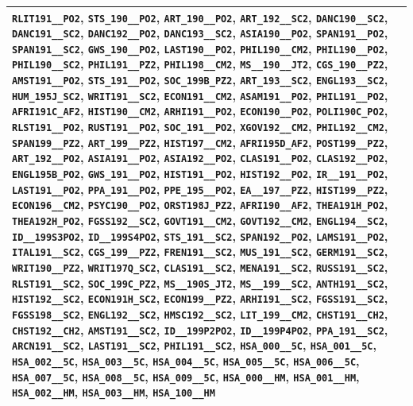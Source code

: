 \begin{longtable}{|p{4.4in}|p{4.4in}|}
\verb|RLIT191__PO2|, \verb|STS_190__PO2|, \verb|ART_190__PO2|, \verb|ART_192__SC2|, \verb|DANC190__SC2|, \verb|DANC191__SC2|, \verb|DANC192__PO2|, \verb|DANC193__SC2|, \verb|ASIA190__PO2|, \verb|SPAN191__PO2|, \verb|SPAN191__SC2|, \verb|GWS_190__PO2|, \verb|LAST190__PO2|, \verb|PHIL190__CM2|, \verb|PHIL190__PO2|, \verb|PHIL190__SC2|, \verb|PHIL191__PZ2|, \verb|PHIL198__CM2|, \verb|MS__190__JT2|, \verb|CGS_190__PZ2|, \verb|AMST191__PO2|, \verb|STS_191__PO2|, \verb|SOC_199B_PZ2|, \verb|ART_193__SC2|, \verb|ENGL193__SC2|, \verb|HUM_195J_SC2|, \verb|WRIT191__SC2|, \verb|ECON191__CM2|, \verb|ASAM191__PO2|, \verb|PHIL191__PO2|, \verb|AFRI191C_AF2|, \verb|HIST190__CM2|, \verb|ARHI191__PO2|, \verb|ECON190__PO2|, \verb|POLI190C_PO2|, \verb|RLST191__PO2|, \verb|RUST191__PO2|, \verb|SOC_191__PO2|, \verb|XGOV192__CM2|, \verb|PHIL192__CM2|, \verb|SPAN199__PZ2|, \verb|ART_199__PZ2|, \verb|HIST197__CM2|, \verb|AFRI195D_AF2|, \verb|POST199__PZ2|, \verb|ART_192__PO2|, \verb|ASIA191__PO2|, \verb|ASIA192__PO2|, \verb|CLAS191__PO2|, \verb|CLAS192__PO2|, \verb|ENGL195B_PO2|, \verb|GWS_191__PO2|, \verb|HIST191__PO2|, \verb|HIST192__PO2|, \verb|IR__191__PO2|, \verb|LAST191__PO2|, \verb|PPA_191__PO2|, \verb|PPE_195__PO2|, \verb|EA__197__PZ2|, \verb|HIST199__PZ2|, \verb|ECON196__CM2|, \verb|PSYC190__PO2|, \verb|ORST198J_PZ2|, \verb|AFRI190__AF2|, \verb|THEA191H_PO2|, \verb|THEA192H_PO2|, \verb|FGSS192__SC2|, \verb|GOVT191__CM2|, \verb|GOVT192__CM2|, \verb|ENGL194__SC2|, \verb|ID__199S3PO2|, \verb|ID__199S4PO2|, \verb|STS_191__SC2|, \verb|SPAN192__PO2|, \verb|LAMS191__PO2|, \verb|ITAL191__SC2|, \verb|CGS_199__PZ2|, \verb|FREN191__SC2|, \verb|MUS_191__SC2|, \verb|GERM191__SC2|, \verb|WRIT190__PZ2|, \verb|WRIT197Q_SC2|, \verb|CLAS191__SC2|, \verb|MENA191__SC2|, \verb|RUSS191__SC2|, \verb|RLST191__SC2|, \verb|SOC_199C_PZ2|, \verb|MS__190S_JT2|, \verb|MS__199__SC2|, \verb|ANTH191__SC2|, \verb|HIST192__SC2|, \verb|ECON191H_SC2|, \verb|ECON199__PZ2|, \verb|ARHI191__SC2|, \verb|FGSS191__SC2|, \verb|FGSS198__SC2|, \verb|ENGL192__SC2|, \verb|HMSC192__SC2|, \verb|LIT_199__CM2|, \verb|CHST191__CH2|, \verb|CHST192__CH2|, \verb|AMST191__SC2|, \verb|ID__199P2PO2|, \verb|ID__199P4PO2|, \verb|PPA_191__SC2|, \verb|ARCN191__SC2|, \verb|LAST191__SC2|, \verb|PHIL191__SC2|, \verb|HSA_000__5C|, \verb|HSA_001__5C|, \verb|HSA_002__5C|, \verb|HSA_003__5C|, \verb|HSA_004__5C|, \verb|HSA_005__5C|, \verb|HSA_006__5C|, \verb|HSA_007__5C|, \verb|HSA_008__5C|, \verb|HSA_009__5C|, \verb|HSA_000__HM|, \verb|HSA_001__HM|, \verb|HSA_002__HM|, \verb|HSA_003__HM|, \verb|HSA_100__HM|\\\hline

\end{longtable}
